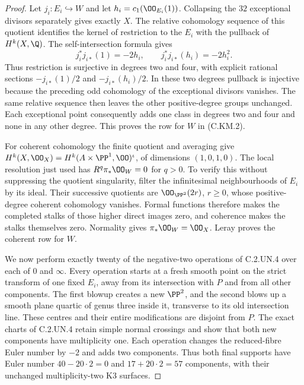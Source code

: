 \begin{proof}
Let $j_i:E_i\hookrightarrow W$ and let
$h_i=c_1(\OO_{E_i}(1))$. Collapsing the $32$ exceptional
divisors separately gives exactly $X$. The relative
cohomology sequence of this quotient identifies the
kernel of restriction to the $E_i$ with the pullback
of $H^k(X,\Q)$. The self-intersection formula gives
\[
 j_i^*j_{i*}(1)=-2h_i,
       \qquad j_i^*j_{i*}(h_i)=-2h_i^2.                 \tag{C.KM.10}
\]
Thus restriction is surjective in degrees two and four,
with explicit rational sections $-j_{i*}(1)/2$ and
$-j_{i*}(h_i)/2$. In these two degrees pullback is
injective because the preceding odd cohomology of the
exceptional divisors vanishes. The same relative
sequence then leaves the other positive-degree groups
unchanged. Each exceptional point consequently adds one
class in degrees two and four and none in any other
degree. This proves the row for $W$ in (C.KM.2).

For coherent cohomology the finite quotient and averaging
give
$H^k(X,\OO_X)=H^k(A\times\PP^1,\OO)^{\iota}$,
of dimensions $(1,0,1,0)$. The local resolution just
used has $R^q\pi_*\OO_W=0$ for $q>0$. To verify this
without suppressing the quotient singularity, filter the
infinitesimal neighbourhoods of $E_i$ by its ideal.
Their successive quotients are $\OO_{\PP^2}(2r)$,
$r\ge0$, whose positive-degree coherent cohomology
vanishes. Formal functions therefore makes the completed
stalks of those higher direct images zero, and coherence
makes the stalks themselves zero. Normality gives
$\pi_*\OO_W=\OO_X$. Leray proves the coherent row for
$W$.

We now perform exactly twenty of the negative-two
operations of C.2.UN.4 over each of $0$ and $\infty$.
Every operation starts at a fresh smooth point on the
strict transform of one fixed $E_i$, away from its
intersection with $P$ and from all other components.
The first blowup creates a new $\PP^2$, and the second
blows up a smooth plane quartic of genus three inside
it, transverse to its old intersection line. These
centres and their entire modifications are disjoint
from $P$. The exact charts of C.2.UN.4 retain simple
normal crossings and show that both new components
have multiplicity one. Each operation changes the
reduced-fibre Euler number by $-2$ and adds two
components. Thus both final supports have Euler number
$40-20\cdot2=0$ and $17+20\cdot2=57$ components,
with their unchanged multiplicity-two K3 surfaces.


\end{proof}
